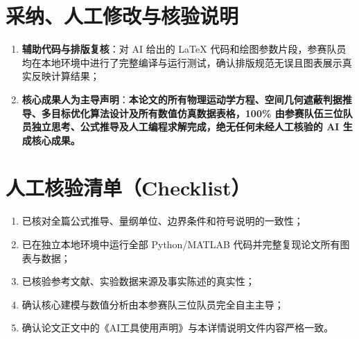 \documentclass[zihao=-4,a4paper,UTF8,fontset=fandol]{ctexart}
\begin{document}
\section{采纳、人工修改与核验说明}
\begin{enumerate}[label=\arabic*),leftmargin=2em,itemsep=0pt,topsep=0.1em]
    \item \textbf{辅助代码与排版复核}：对 AI 给出的 \LaTeX{} 代码和绘图参数片段，参赛队员均在本地环境中进行了完整编译与运行测试，确认排版规范无误且图表展示真实反映计算结果；
    \item \textbf{核心成果人为主导声明}：\textbf{本论文的所有物理运动学方程、空间几何遮蔽判据推导、多目标优化算法设计及所有数值仿真数据表格，100\% 由参赛队伍三位队员独立思考、公式推导及人工编程求解完成，绝无任何未经人工核验的 AI 生成核心成果。}
\end{enumerate}

\section{人工核验清单（Checklist）}
\begin{enumerate}[label=\arabic*),itemsep=0pt,topsep=0.1em]
    \item 已核对全篇公式推导、量纲单位、边界条件和符号说明的一致性；
    \item 已在独立本地环境中运行全部 Python/MATLAB 代码并完整复现论文所有图表与数据；
    \item 已核验参考文献、实验数据来源及事实陈述的真实性；
    \item 确认核心建模与数值分析由本参赛队三位队员完全自主主导；
    \item 确认论文正文中的《AI工具使用声明》与本详情说明文件内容严格一致。
\end{enumerate}
\end{document}

